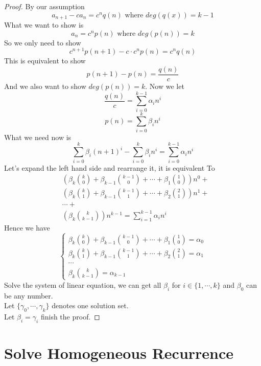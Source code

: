\begin{proof}
    By our assumption $$a_{n+1}-ca_n=c^nq(n) \text{ where } deg(q(x))=k-1$$
    What we want to show is $$a_n=c^np(n) \text{ where } deg(p(n))=k$$
    So we only need to show $$c^{n+1}p(n+1)-c \cdot c^{n}p(n)=c^nq(n)$$
    This is equivalent to show $$p(n+1)-p(n)=\frac{q(n)}{c}$$
    And we also want to show $deg(p(n))=k$.
    Now we let $$\frac{q(n)}{c}=\sum_{i=0}^{k-1}\alpha_in^i$$
    $$p(n)=\sum_{i=0}^k\beta_in^i$$
    What we need now is $$\sum_{i=0}^k\beta_i(n+1)^i-\sum_{i=0}^k\beta_in^i=\sum_{i=0}^{k-1}\alpha_in^i$$
    Let's expand the left hand side and rearrange it, it is equivalent To
    \begin{equation}
        \begin{split}
            &\left(\beta_k{k \choose 0}+\beta_{k-1}{k-1 \choose 0}+ \cdots +\beta_1{1 \choose 0}\right) n^0+\\
            &\left(\beta_k{k \choose 1}+\beta_{k-1}{k-1 \choose 1}+ \cdots +\beta_2{2 \choose 1}\right) n^1+ \\
            & \cdots +\\
            &\left( \beta_k{k \choose k-1}\right) n^{k-1}=\sum_{i=1}^{k-1}\alpha_in^i
        \end{split}
    \end{equation}
    Hence we have 
    \begin{equation}
        \begin{cases}
            \beta_k{k \choose 0}+\beta_{k-1}{k-1 \choose 0}+ \cdots +\beta_1{1 \choose 0}=\alpha_0\\
            \beta_k{k \choose 1}+\beta_{k-1}{k-1 \choose 1}+ \cdots +\beta_2{2 \choose 1}=\alpha_1\\
            \cdots\\
            \beta_k{k \choose k-1}=\alpha_{k-1}
        \end{cases}
    \end{equation}
    Solve the system of linear equation, we can get all $\beta_i$ for $i \in \{1, \cdots ,k\}$ and $\beta_0$ can be any number.\\
    Let $\{\gamma_0, \cdots ,\gamma_k\}$ denotes one solution set.\\
    Let $\beta_i=\gamma_i$ finish the proof.
\end{proof}


\section{Solve Homogeneous Recurrence}

